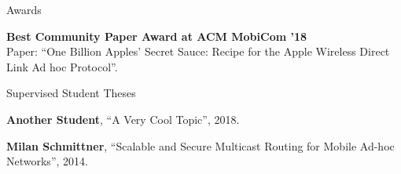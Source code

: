 \begin{cv}{}
\begin{cvlist}{{Awards}}
\item[Publication] \textbf{Best Community Paper Award at ACM MobiCom '18} \\
Paper: \enquote{One Billion Apples’ Secret Sauce: Recipe for the Apple Wireless Direct Link Ad hoc Protocol}.

\end{cvlist}


\begin{cvlist}{{Supervised Student Theses}}

\item[B.\,Sc. Thesis] \textbf{Another Student}, \enquote{A Very Cool Topic}, 2018.

\item[M.\,Sc. Thesis] \textbf{Milan Schmittner}, \enquote{Scalable and Secure Multicast Routing for Mobile Ad-hoc Networks}, 2014.

\end{cvlist}


\date{\myLocation, }

\end{cv}
